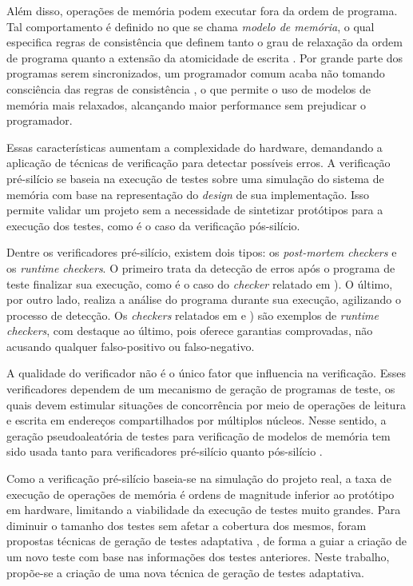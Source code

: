 \documentclass{ufsc-thesis} %
\begin{document}
Além disso, operações de memória podem executar fora da ordem de programa. Tal comportamento é
definido no que se chama \textit{modelo de memória}, o qual especifica regras de consistência
que definem tanto o grau de relaxação da ordem de programa quanto a extensão da atomicidade de
escrita \cite{Adve:1996}. Por grande parte dos programas serem sincronizados, um programador
comum acaba não tomando consciência das regras de consistência \cite{Hennessy:2011}, o que
permite o uso de modelos de memória mais relaxados, alcançando maior performance sem prejudicar
o programador.

Essas características aumentam a complexidade do hardware, demandando a aplicação de técnicas
de verificação para detectar possíveis erros. A verificação pré-silício se baseia na execução
de testes sobre uma simulação do sistema de memória com base na representação do
\textit{design} de sua implementação. Isso permite validar um projeto sem a necessidade de
sintetizar protótipos para a execução dos testes, como é o caso da verificação pós-silício.

Dentre os verificadores pré-silício, existem dois tipos: os \textit{post-mortem checkers} e os
\textit{runtime checkers}. O primeiro trata da detecção de erros após o programa de teste
finalizar sua execução, como é o caso do \textit{checker} relatado em ).
O último, por outro lado, realiza a análise do programa durante sua execução, agilizando o
processo de detecção. Os \textit{checkers} relatados em  e
) são exemplos de \textit{runtime checkers}, com destaque ao último,
pois oferece garantias comprovadas, não acusando qualquer falso-positivo ou falso-negativo.

A qualidade do verificador não é o único fator que influencia na verificação. Esses
verificadores dependem de um mecanismo de geração de programas de teste, os quais devem
estimular situações de concorrência por meio de operações de leitura e escrita em endereços
compartilhados por múltiplos núcleos. Nesse sentido, a geração pseudoaleatória de testes para
verificação de modelos de memória tem sido usada tanto para verificadores pré-silício
\cite{Shacham:2008, Freitas:2013} quanto pós-silício \cite{Hangal:2004, Manovit:2006:c,
Roy:2006,Hu:2012}.

Como a verificação pré-silício baseia-se na simulação do projeto real, a taxa de execução de
operações de memória é ordens de magnitude inferior ao protótipo em hardware, limitando a
viabilidade da execução de testes muito grandes. Para diminuir o tamanho dos testes sem afetar
a cobertura dos mesmos, foram propostas técnicas de geração de testes adaptativa
\cite{Wagner:2008m, Elver:2016}, de forma a guiar a criação de um novo teste com base nas
informações dos testes anteriores. Neste trabalho, propõe-se a criação de uma nova técnica de
geração de testes adaptativa.
\end{document}
